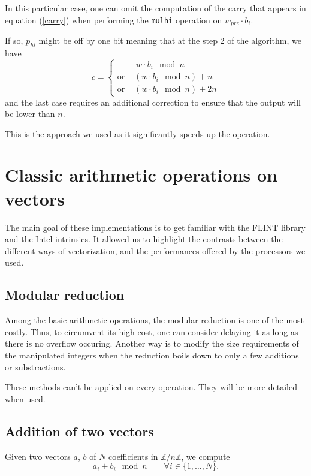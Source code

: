 \documentclass[a4paper]{article}
\begin{document}
\begin{remark}
    In this particular case, one can omit the computation of the carry that appears in equation (\ref{carry})
    when performing the \texttt{mulhi} operation on $w_{pre}\cdot b_i$.

    If so, $p_{hi}$ might be off by one bit meaning that at the step 2 of the algorithm, we have 
    \[
    c = 
    \left\{
    \begin{array}{ll}
        & \ w\cdot b_i \mod n \\
        \text{or } & (w\cdot b_i \mod n) + n \\
        \text{or } & (w\cdot b_i \mod n) + 2n
    \end{array}
    \right.
    \]
    and the last case requires an additional correction to ensure that the output will be lower than $n$.

    This is the approach we used as it significantly speeds up the operation.
\end{remark}

\section{Classic arithmetic operations on vectors}

The main goal of these implementations is to get familiar with the FLINT library and the Intel intrinsics.
It allowed us to highlight the contrasts between the different ways of vectorization, and the performances
offered by the processors we used. 

\subsection{Modular reduction}

Among the basic arithmetic operations, the modular reduction is one of the most costly. 
Thus, to circumvent its high cost, one can consider delaying it as long as there is no overflow occuring.
Another way is to modify the size requirements of the manipulated integers when the reduction boils down to
only a few additions or substractions.

These methods can't be applied on every operation. They will be more detailed when used.

\subsection{Addition of two vectors}

Given two vectors $a$, $b$ of $N$ coefficients in $\mathbb{Z}/n\mathbb{Z}$, we compute
\[
a_i + b_i \mod n \qquad \forall i\in \{1,\dots,N\}.
\]
\end{document}
